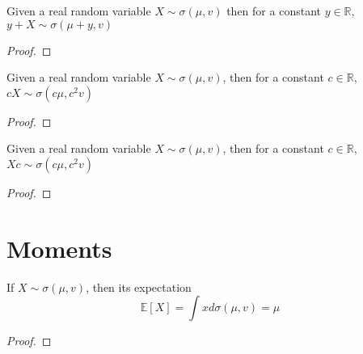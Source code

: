 \begin{lemma}
  \label{lem:semicircleReal_const_add}
  \leanok
  Given a real random variable $X \sim \sigma(\mu, v)$
  then for a constant $y \in \mathbb{R}$, $y + X \sim \sigma(\mu + y, v)$
  \begin{proof}

  \end{proof}
\end{lemma}


\begin{lemma}
  \label{lem:semicircleReal_const_mul}
  \leanok
  Given a real random variable $X \sim \sigma(\mu, v)$,
  then for a constant $c \in \mathbb{R}$, $cX \sim \sigma(c\mu , c^2v)$
  \begin{proof}

  \end{proof}
\end{lemma}


\begin{lemma}
  \label{lem:semicircleReal_mul_const}
  \leanok
   Given a real random variable $X \sim \sigma(\mu, v)$,
  then for a constant $c \in \mathbb{R}$, $Xc \sim \sigma(c \mu  , c^2v)$
  \begin{proof}

  \end{proof}
\end{lemma}


\section{Moments}

\begin{lemma}
  \label{lem:integral_id_semicircleReal}
  \notready
  If $X \sim \sigma(\mu, v)$, then its expectation $$\mathbb{E}[X] = \int x d \sigma(\mu, v) = \mu$$
  \begin{proof}
  \end{proof}
\end{lemma}

